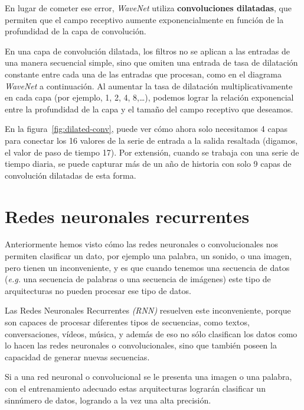 \documentclass[a4paper,12pt]{article}
\begin{document}
En lugar de cometer ese error, \textit{WaveNet} utiliza \textbf{convoluciones dilatadas}, que permiten que el campo receptivo aumente exponencialmente en función de la profundidad de la capa de convolución. 

En una capa de convolución dilatada, los filtros no se aplican a las entradas de una manera secuencial simple, sino que omiten una entrada de tasa de dilatación constante entre cada una de las entradas que procesan, como en el diagrama \textit{WaveNet} a continuación. Al aumentar la tasa de dilatación multiplicativamente en cada capa (por ejemplo, 1, 2, 4, 8,…), podemos lograr la relación exponencial entre la profundidad de la capa y el tamaño del campo receptivo que deseamos. 

En la figura~\ref{fig:dilated-conv}, puede ver cómo ahora solo necesitamos 4 capas para conectar los 16 valores de la serie de entrada a la salida resaltada (digamos, el valor de paso de tiempo 17). Por extensión, cuando se trabaja con una serie de tiempo diaria, se puede capturar más de un año de historia con solo 9 capas de convolución dilatadas de esta forma.

\section{Redes neuronales recurrentes}
Anteriormente hemos visto cómo las redes neuronales o convolucionales nos permiten clasificar un dato, por ejemplo una palabra, un sonido, o una imagen, pero tienen un inconveniente, y es que cuando tenemos una secuencia de datos (\textit{e.g.} una secuencia de palabras o una secuencia de imágenes) este tipo de arquitecturas no pueden procesar ese tipo de datos. 

Las Redes Neuronales Recurrentes \textit{(RNN)} \citep{karpathy:rnn} resuelven este inconveniente, porque son capaces de procesar diferentes tipos de secuencias, como textos, conversaciones, vídeos, música, y además de eso no sólo clasifican los datos como lo hacen las redes neuronales o convolucionales, sino que también poseen la capacidad de generar nuevas secuencias.

Si a una red neuronal o convolucional se le presenta una imagen o una palabra, con el entrenamiento adecuado estas arquitecturas lograrán clasificar un sinnúmero de datos, logrando a la vez una alta precisión. 
\end{document}
